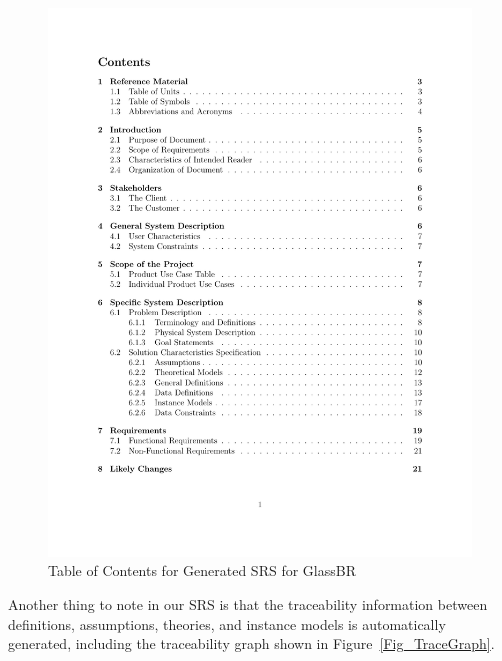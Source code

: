 \documentclass[sigconf]{acmart}
\begin{document}
{\begin{figure}
\begin{center}
\includegraphics[scale=0.5]{./figures/TofC.pdf}
\end{center}
\caption{Table of Contents for Generated SRS for GlassBR}
\label{Fig_ToCGlassBRSRS}
\end{figure}

Another thing to note in our SRS is that the traceability information between
definitions, assumptions, theories, and instance models is automatically 
generated, including the traceability graph shown in 
Figure~\ref{Fig_TraceGraph}.

}
\end{document}
